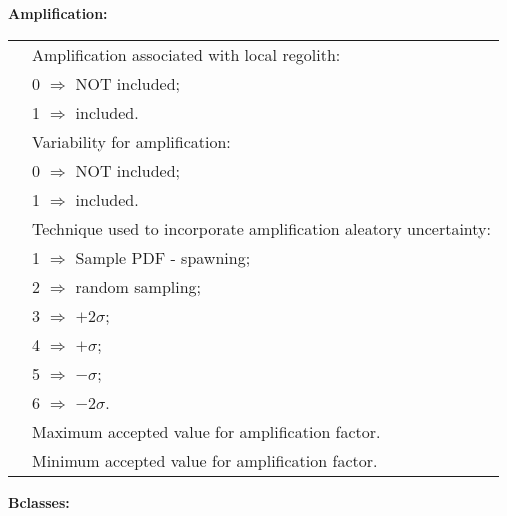 \vspace{2em} \textbf{Amplification:}

\begin{supertabular}{lp{0.6\textwidth}}
  &  Amplification associated with local regolith: \\
 & \hspace{0.5em} 0 $\Rightarrow$ NOT included; \\
 & \hspace{0.5em}  1 $\Rightarrow$ included. \\
    &   Variability for amplification: \\
 & \hspace{0.5em} 0 $\Rightarrow$ NOT included; \\
 & \hspace{0.5em} 1 $\Rightarrow$ included.  \\
 & Technique used to incorporate amplification aleatory uncertainty: \\
 & \hspace{0.5em} 1 $\Rightarrow$ Sample PDF - spawning; \\
 & \hspace{0.5em} 2 $\Rightarrow$ random sampling; \\
 & \hspace{0.5em} 3 $\Rightarrow$ $+2\sigma$; \\
 & \hspace{0.5em} 4 $\Rightarrow$ $+\sigma$; \\
 & \hspace{0.5em} 5 $\Rightarrow$ $-\sigma$; \\
 & \hspace{0.5em} 6 $\Rightarrow$ $-2\sigma$.\\
    &   Maximum accepted value for amplification factor.   \\
    &   Minimum accepted value for amplification factor.    \\
 \end{supertabular}


\vspace{2em} \textbf{Bclasses:}

